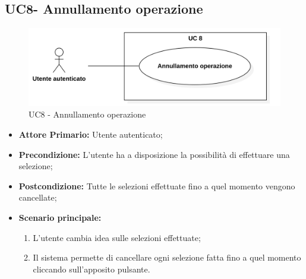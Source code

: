 \subsection{UC8- Annullamento operazione}
\begin{figure}[H]
    \centering
    \includegraphics[scale = 0.7]{components/img/UC8.png}
    \caption{UC8 - Annullamento operazione}
\end{figure}
\begin{itemize}
\item \textbf{Attore Primario:} Utente autenticato;
\item \textbf{Precondizione:} L'utente ha a disposizione la possibilità di effettuare una selezione;
\item \textbf{Postcondizione:} Tutte le selezioni effettuate fino a quel momento vengono cancellate;
\item \textbf{Scenario principale:}
    \begin{enumerate}
    \item L'utente cambia idea sulle selezioni effettuate;
    \item Il sistema permette di cancellare ogni selezione fatta fino a quel momento cliccando sull'apposito pulsante.
    \end{enumerate}
\end{itemize}